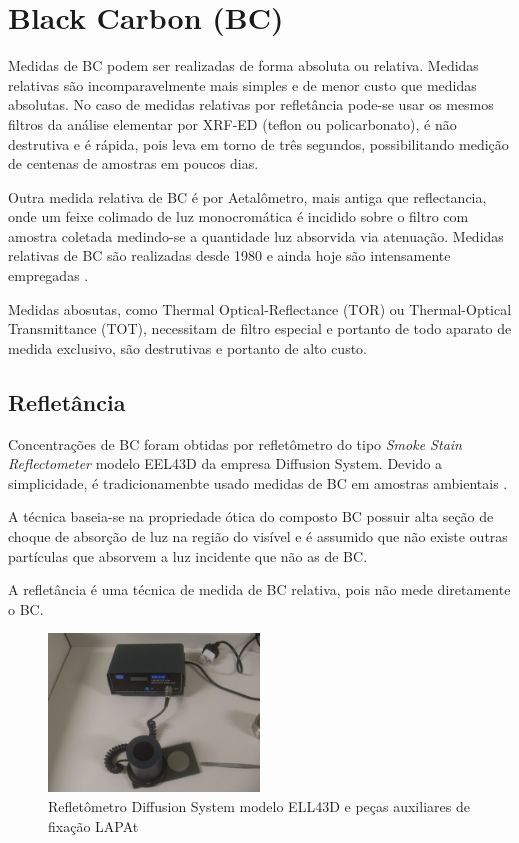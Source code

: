 \section{Black Carbon (BC)}

Medidas de BC podem ser realizadas de forma absoluta ou relativa.
Medidas relativas são incomparavelmente mais simples 
e de menor custo que medidas absolutas. 
No caso de medidas relativas por refletância pode-se usar os mesmos filtros 
da análise elementar por XRF-ED (teflon ou policarbonato), é não destrutiva e 
é rápida, pois leva em torno de três segundos, possibilitando medição de centenas de 
amostras em poucos dias.

Outra medida relativa de BC é por Aetalômetro, mais antiga que reflectancia,
onde um feixe colimado de  luz monocromática é incidido sobre o
filtro com amostra coletada medindo-se a quantidade luz absorvida via 
atenuação. Medidas relativas de BC são realizadas desde 1980 e ainda hoje são 
intensamente empregadas \citep{targino2016}.

Medidas abosutas, como Thermal Optical-Reflectance (TOR) ou 
Thermal-Optical Transmittance (TOT), necessitam de filtro especial e portanto de 
todo aparato de medida exclusivo, são destrutivas e portanto de alto custo.

\subsection{Refletância}

Concentrações de BC foram obtidas por refletômetro do tipo 
\textit{Smoke Stain Reflectometer} modelo EEL43D da empresa Diffusion System.
Devido a simplicidade, é tradicionamenbte usado medidas de BC em 
amostras ambientais \citep{lack2014}. 

A técnica baseia-se na propriedade ótica do composto BC possuir alta seção 
de choque 
de absorção de luz na região do visível e é assumido que não existe outras 
partículas que absorvem a luz incidente que não as de BC.

A refletância é uma técnica de medida de BC relativa, pois não mede diretamente
o BC. 

\begin{figure}[H]
  \centering
  \includegraphics[width=0.5\textwidth]{../inputs/images/refletometro.jpg}
  \caption{Refletômetro Diffusion System modelo ELL43D 
           e peças auxiliares de fixação LAPAt}
\end{figure}

